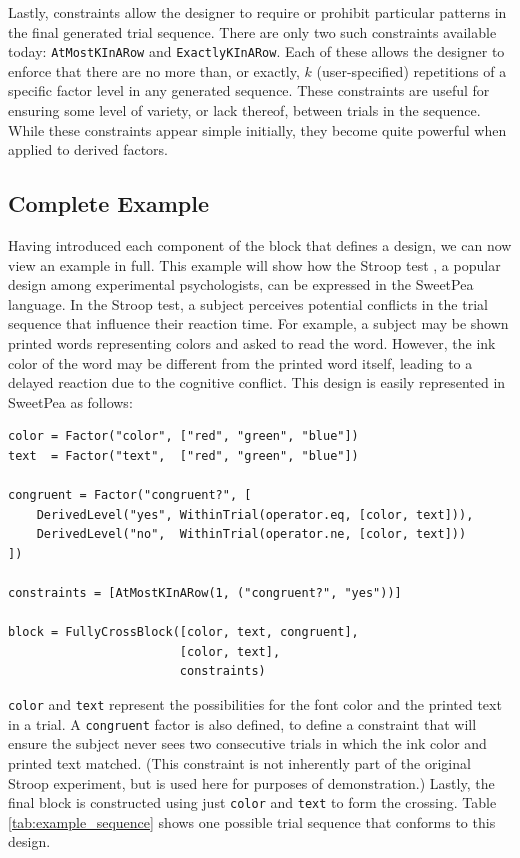 Lastly, constraints allow the designer to require or prohibit particular patterns in the final generated trial sequence. There are only two such constraints available today: \texttt{AtMostKInARow} and \texttt{ExactlyKInARow}. Each of these allows the designer to enforce that there are no more than, or exactly, $k$ (user-specified) repetitions of a specific factor level in any generated sequence. These constraints are useful for ensuring some level of variety, or lack thereof, between trials in the sequence. While these constraints appear simple initially, they become quite powerful when applied to derived factors.

\subsection{Complete Example}

Having introduced each component of the block that defines a design, we can now view an example in full. This example will show how the Stroop test \cite{stroop1935studies}, a popular design among experimental psychologists, can be expressed in the SweetPea language. In the Stroop test, a subject perceives potential conflicts in the trial sequence that influence their reaction time. For example, a subject may be shown printed words representing colors and asked to read the word. However, the ink color of the word may be different from the printed word itself, leading to a delayed reaction due to the cognitive conflict. This design is easily represented in SweetPea as follows:

\begin{verbatim}
color = Factor("color", ["red", "green", "blue"])
text  = Factor("text",  ["red", "green", "blue"])

congruent = Factor("congruent?", [
    DerivedLevel("yes", WithinTrial(operator.eq, [color, text])),
    DerivedLevel("no",  WithinTrial(operator.ne, [color, text]))
])

constraints = [AtMostKInARow(1, ("congruent?", "yes"))]

block = FullyCrossBlock([color, text, congruent],
                        [color, text],
                        constraints)
\end{verbatim}

\texttt{color} and \texttt{text} represent the possibilities for the font color and the printed text in a trial. A \texttt{congruent} factor is also defined, to define a constraint that will ensure the subject never sees two consecutive trials in which the ink color and printed text matched. (This constraint is not inherently part of the original Stroop experiment, but is used here for purposes of demonstration.) Lastly, the final block is constructed using just \texttt{color} and \texttt{text} to form the crossing. Table \ref{tab:example_sequence} shows one possible trial sequence that conforms to this design.

